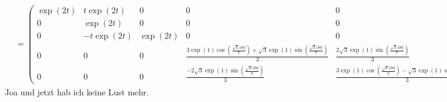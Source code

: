 \begin{solution}
\begin{align*}
  &= \begin{pmatrix}
    \exp(2t) & t\exp(2t) & 0 & 0 & 0 \\
    0 & \exp(2t) & 0 & 0 & 0 \\
    0 & -t\exp(2t) & \exp(2t) & 0 & 0 \\
    0 & 0 & 0 &
    \frac{3\exp(1)\cos(\frac{\sqrt{3}180}{\pi})+\sqrt{3}\exp(1)\sin(\frac{\sqrt
    {3}180}{\pi})}{3} & \frac{2\sqrt{3}\exp(1)\sin(\frac{\sqrt{3}180}{\pi})}{3}
    \\
    0 & 0 & 0 & \frac{-2\sqrt{3}\exp(1)\sin(\frac{\sqrt{3}180}{\pi})}{3} &
    \frac{3\exp(1)\cos(\frac{\sqrt{3}180}{\pi})-
    \sqrt{3}\exp(1)\sin(\frac{\sqrt{3}180}{\pi})}{3}
  \end{pmatrix}
\end{align*}
Joa und jetzt hab ich keine Lust mehr.
\end{solution}
